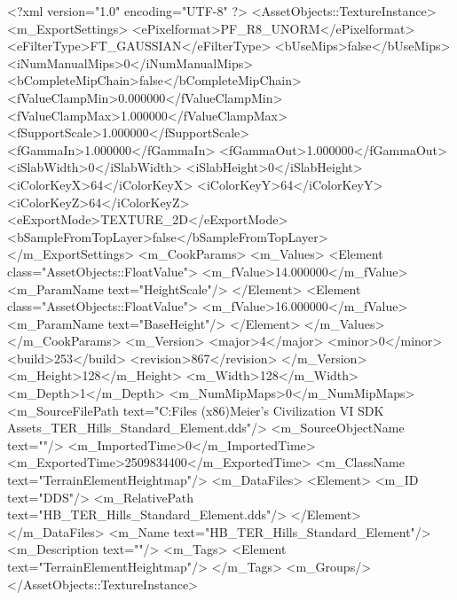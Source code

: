 <?xml version="1.0" encoding="UTF-8" ?>
<AssetObjects::TextureInstance>
	<m_ExportSettings>
		<ePixelformat>PF_R8_UNORM</ePixelformat>
		<eFilterType>FT_GAUSSIAN</eFilterType>
		<bUseMips>false</bUseMips>
		<iNumManualMips>0</iNumManualMips>
		<bCompleteMipChain>false</bCompleteMipChain>
		<fValueClampMin>0.000000</fValueClampMin>
		<fValueClampMax>1.000000</fValueClampMax>
		<fSupportScale>1.000000</fSupportScale>
		<fGammaIn>1.000000</fGammaIn>
		<fGammaOut>1.000000</fGammaOut>
		<iSlabWidth>0</iSlabWidth>
		<iSlabHeight>0</iSlabHeight>
		<iColorKeyX>64</iColorKeyX>
		<iColorKeyY>64</iColorKeyY>
		<iColorKeyZ>64</iColorKeyZ>
		<eExportMode>TEXTURE_2D</eExportMode>
		<bSampleFromTopLayer>false</bSampleFromTopLayer>
	</m_ExportSettings>
	<m_CookParams>
		<m_Values>
			<Element class="AssetObjects::FloatValue">
				<m_fValue>14.000000</m_fValue>
				<m_ParamName text="HeightScale"/>
			</Element>
			<Element class="AssetObjects::FloatValue">
				<m_fValue>16.000000</m_fValue>
				<m_ParamName text="BaseHeight"/>
			</Element>
		</m_Values>
	</m_CookParams>
	<m_Version>
		<major>4</major>
		<minor>0</minor>
		<build>253</build>
		<revision>867</revision>
	</m_Version>
	<m_Height>128</m_Height>
	<m_Width>128</m_Width>
	<m_Depth>1</m_Depth>
	<m_NumMipMaps>0</m_NumMipMaps>
	<m_SourceFilePath text="C:\Program Files (x86)\Steam\SteamApps\common\Sid Meier's Civilization VI SDK Assets\pantry\Textures\HB_TER_Hills_Standard_Element.dds"/>
	<m_SourceObjectName text=""/>
	<m_ImportedTime>0</m_ImportedTime>
	<m_ExportedTime>2509834400</m_ExportedTime>
	<m_ClassName text="TerrainElementHeightmap"/>
	<m_DataFiles>
		<Element>
			<m_ID text="DDS"/>
			<m_RelativePath text="HB_TER_Hills_Standard_Element.dds"/>
		</Element>
	</m_DataFiles>
	<m_Name text="HB_TER_Hills_Standard_Element"/>
	<m_Description text=""/>
	<m_Tags>
		<Element text="TerrainElementHeightmap"/>
	</m_Tags>
	<m_Groups/>
</AssetObjects::TextureInstance>

 